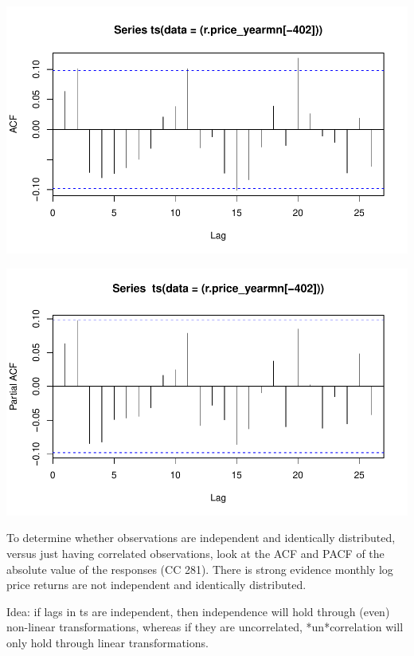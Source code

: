 \documentclass[11pt]{article}\usepackage[]{graphicx}\usepackage[]{color}
\makeatletter
\def\maxwidth{ %
  \ifdim\Gin@nat@width>\linewidth
    \linewidth
  \else
    \Gin@nat@width
  \fi
}
\newenvironment{knitrout}{}{} %
\makeatother
\begin{document}
\begin{knitrout}
{}




{\centering \includegraphics[width=\maxwidth]{figure/assess_autocorr-3} 

}




{\centering \includegraphics[width=\maxwidth]{figure/assess_autocorr-4} 

}



\end{knitrout}

To determine whether observations are independent and identically distributed, versus just having correlated observations, look at the ACF and PACF of the absolute value of the responses (CC 281). There is strong evidence monthly log price returns are not independent and identically distributed. 

Idea: if lags in ts are independent, then independence will hold through (even) non-linear transformations, whereas if they are uncorrelated, *un*correlation will only hold through linear transformations.
\end{document}
